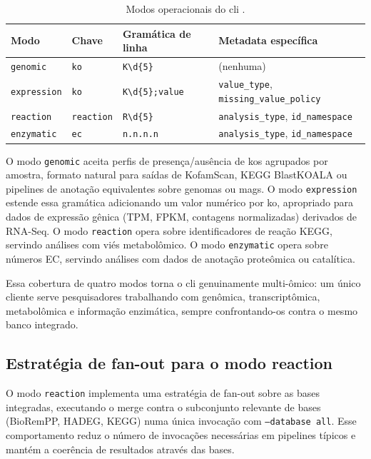 \begin{table}[htbp]
\centering
\caption{Modos operacionais do \gls{cli} \biorempp{}.}
\label{tab:c4-modos}
\small
\begin{tabular}{@{}lllp{5cm}@{}}
\toprule
\textbf{Modo} & \textbf{Chave} & \textbf{Gramática de linha} & \textbf{Metadata específica} \\
\midrule
\texttt{genomic}     & \texttt{ko}       & \texttt{K\textbackslash d\{5\}}          & (nenhuma) \\
\texttt{expression}  & \texttt{ko}       & \texttt{K\textbackslash d\{5\};value}    & \texttt{value\_type}, \texttt{missing\_value\_policy} \\
\texttt{reaction}    & \texttt{reaction} & \texttt{R\textbackslash d\{5\}}          & \texttt{analysis\_type}, \texttt{id\_namespace} \\
\texttt{enzymatic}   & \texttt{ec}       & \texttt{n.n.n.n} & \texttt{analysis\_type}, \texttt{id\_namespace} \\
\bottomrule
\end{tabular}
\end{table}

O modo \texttt{genomic} aceita perfis de presença/ausência de \glspl{ko} agrupados por amostra, formato natural para saídas de KofamScan, KEGG BlastKOALA ou pipelines de anotação equivalentes sobre genomas ou \glspl{mag}. O modo \texttt{expression} estende essa gramática adicionando um valor numérico por \gls{ko}, apropriado para dados de expressão gênica (TPM, FPKM, contagens normalizadas) derivados de RNA-Seq. O modo \texttt{reaction} opera sobre identificadores de reação KEGG, servindo análises com viés metabolômico. O modo \texttt{enzymatic} opera sobre números EC, servindo análises com dados de anotação proteômica ou catalítica.

Essa cobertura de quatro modos torna o \gls{cli} genuinamente multi-ômico: um único cliente serve pesquisadores trabalhando com genômica, transcriptômica, metabolômica e informação enzimática, sempre confrontando-os contra o mesmo banco integrado.

\subsection{Estratégia de fan-out para o modo reaction}

O modo \texttt{reaction} implementa uma estratégia de fan-out sobre as bases integradas, executando o merge contra o subconjunto relevante de bases (BioRemPP, HADEG, KEGG) numa única invocação com \texttt{--database all}. Esse comportamento reduz o número de invocações necessárias em pipelines típicos e mantém a coerência de resultados através das bases.

